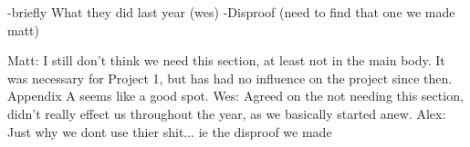 \color{red}
-briefly What they did last year (wes) 
-Disproof (need to find that one we made matt)

Matt: I still don't think we need this section, at least not in the main body. It was necessary for Project 1, but has had no influence on the project since then. Appendix A seems like a good spot.
Wes: Agreed on the not needing this section, didn't really effect us throughout the year, as we basically started anew.
Alex: Just why we dont use thier shit... ie the disproof we made
\color{black}
